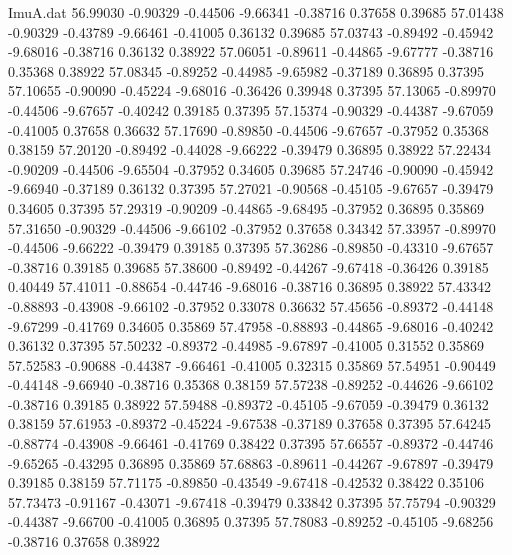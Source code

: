 \begin{filecontents}{ImuA.dat}
  56.99030   -0.90329   -0.44506   -9.66341   -0.38716    0.37658    0.39685
  57.01438   -0.90329   -0.43789   -9.66461   -0.41005    0.36132    0.39685
  57.03743   -0.89492   -0.45942   -9.68016   -0.38716    0.36132    0.38922
  57.06051   -0.89611   -0.44865   -9.67777   -0.38716    0.35368    0.38922
  57.08345   -0.89252   -0.44985   -9.65982   -0.37189    0.36895    0.37395
  57.10655   -0.90090   -0.45224   -9.68016   -0.36426    0.39948    0.37395
  57.13065   -0.89970   -0.44506   -9.67657   -0.40242    0.39185    0.37395
  57.15374   -0.90329   -0.44387   -9.67059   -0.41005    0.37658    0.36632
  57.17690   -0.89850   -0.44506   -9.67657   -0.37952    0.35368    0.38159
  57.20120   -0.89492   -0.44028   -9.66222   -0.39479    0.36895    0.38922
  57.22434   -0.90209   -0.44506   -9.65504   -0.37952    0.34605    0.39685
  57.24746   -0.90090   -0.45942   -9.66940   -0.37189    0.36132    0.37395
  57.27021   -0.90568   -0.45105   -9.67657   -0.39479    0.34605    0.37395
  57.29319   -0.90209   -0.44865   -9.68495   -0.37952    0.36895    0.35869
  57.31650   -0.90329   -0.44506   -9.66102   -0.37952    0.37658    0.34342
  57.33957   -0.89970   -0.44506   -9.66222   -0.39479    0.39185    0.37395
  57.36286   -0.89850   -0.43310   -9.67657   -0.38716    0.39185    0.39685
  57.38600   -0.89492   -0.44267   -9.67418   -0.36426    0.39185    0.40449
  57.41011   -0.88654   -0.44746   -9.68016   -0.38716    0.36895    0.38922
  57.43342   -0.88893   -0.43908   -9.66102   -0.37952    0.33078    0.36632
  57.45656   -0.89372   -0.44148   -9.67299   -0.41769    0.34605    0.35869
  57.47958   -0.88893   -0.44865   -9.68016   -0.40242    0.36132    0.37395
  57.50232   -0.89372   -0.44985   -9.67897   -0.41005    0.31552    0.35869
  57.52583   -0.90688   -0.44387   -9.66461   -0.41005    0.32315    0.35869
  57.54951   -0.90449   -0.44148   -9.66940   -0.38716    0.35368    0.38159
  57.57238   -0.89252   -0.44626   -9.66102   -0.38716    0.39185    0.38922
  57.59488   -0.89372   -0.45105   -9.67059   -0.39479    0.36132    0.38159
  57.61953   -0.89372   -0.45224   -9.67538   -0.37189    0.37658    0.37395
  57.64245   -0.88774   -0.43908   -9.66461   -0.41769    0.38422    0.37395
  57.66557   -0.89372   -0.44746   -9.65265   -0.43295    0.36895    0.35869
  57.68863   -0.89611   -0.44267   -9.67897   -0.39479    0.39185    0.38159
  57.71175   -0.89850   -0.43549   -9.67418   -0.42532    0.38422    0.35106
  57.73473   -0.91167   -0.43071   -9.67418   -0.39479    0.33842    0.37395
  57.75794   -0.90329   -0.44387   -9.66700   -0.41005    0.36895    0.37395
  57.78083   -0.89252   -0.45105   -9.68256   -0.38716    0.37658    0.38922
\end{filecontents}
